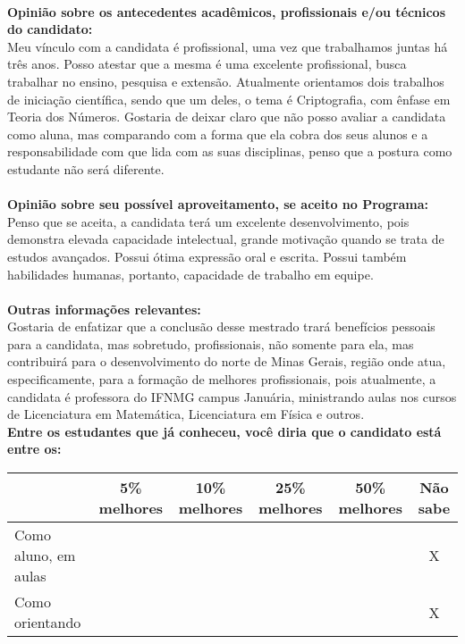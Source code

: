 \documentclass[11pt]{article}
\begin{document}
\\
\textbf{Opinião sobre os antecedentes acadêmicos, profissionais e/ou técnicos do candidato:}
\\Meu vínculo com a candidata é profissional, uma vez que trabalhamos juntas há três anos. Posso atestar que a mesma é uma excelente profissional, busca trabalhar no ensino, pesquisa e extensão. Atualmente orientamos dois trabalhos de iniciação científica, sendo que um deles, o tema é Criptografia, com ênfase em Teoria dos Números. Gostaria de deixar claro que não posso avaliar a candidata como aluna, mas comparando com a forma que ela cobra dos seus alunos e a responsabilidade com que lida com as suas disciplinas, penso que a postura como estudante não será diferente.\\
\\
\textbf{Opinião sobre seu possível aproveitamento, se aceito no Programa:}
\\Penso que se aceita, a candidata terá um excelente desenvolvimento, pois demonstra elevada capacidade intelectual, grande motivação quando se trata de estudos avançados. Possui ótima expressão oral e escrita. Possui também habilidades humanas, portanto, capacidade de trabalho em equipe. \\ 
\\
\textbf{Outras informações relevantes:} \\Gostaria de enfatizar que a conclusão desse mestrado trará benefícios pessoais para a candidata, mas sobretudo, profissionais, não somente para ela, mas contribuirá para o desenvolvimento do norte de Minas Gerais, região onde atua, especificamente, para a formação de melhores profissionais, pois atualmente, a candidata é professora do IFNMG campus Januária, ministrando aulas nos cursos de Licenciatura em Matemática, Licenciatura em Física e outros.
\\[0.3cm]
\textbf{Entre os estudantes que já conheceu, você diria que o candidato está entre os:}
\\
\begin{tabular}{|l|c|c|c|c|c|}
\hline
 & 5\% melhores & 10\% melhores & 25\% melhores & 50\% melhores & Não sabe \\
\hline
Como aluno, em aulas &  &  &  &  & X\\
\hline
Como orientando &  &  &  &  & X\\
\hline
\end{tabular}
\end{document}
